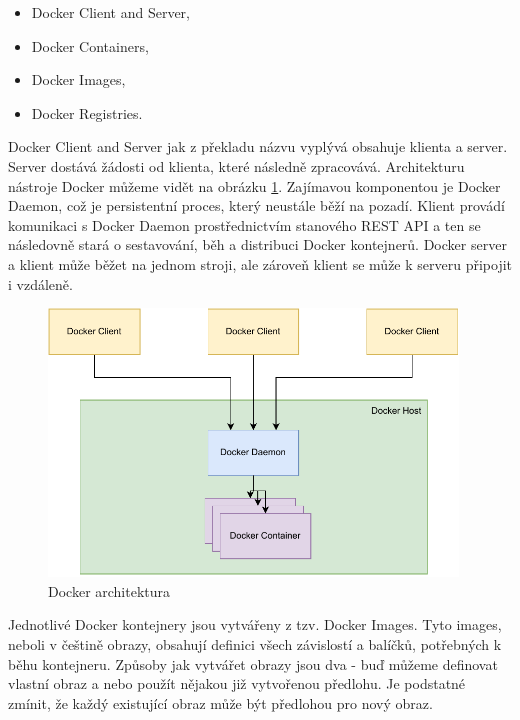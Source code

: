 \begin{itemize}
    \item Docker Client and Server,
    \item Docker Containers,
    \item Docker Images,
    \item Docker Registries.
\end{itemize}

Docker Client and Server jak z překladu názvu vyplývá obsahuje klienta a server. Server dostává žádosti od klienta, které následně zpracovává. Architekturu nástroje Docker můžeme vidět na obrázku \ref{fig:docker_arch}. Zajímavou komponentou je Docker Daemon, což je persistentní proces, který neustále běží na pozadí. Klient provádí komunikaci s Docker Daemon prostřednictvím stanového REST API a ten se následovně stará o sestavování, běh a distribuci Docker kontejnerů. Docker server a klient může běžet na jednom stroji, ale zároveň klient se může k serveru připojit i vzdáleně. 
\cite{turnbull2014docker}\cite{docker_overview}

\begin{figure}[htbp]
    \centering 
    \includegraphics[width=0.97\textwidth]{assets/img/docker_arch.pdf}
    \caption{Docker architektura}
    \label{fig:docker_arch}
\end{figure}

Jednotlivé Docker kontejnery jsou vytvářeny z tzv. Docker Images. Tyto images, neboli v češtině obrazy, obsahují definici všech závislostí a balíčků, potřebných k běhu kontejneru. Způsoby jak vytvářet obrazy jsou dva - buď můžeme definovat vlastní obraz a nebo použít nějakou již vytvořenou předlohu. Je podstatné zmínit, že každý existující obraz může být předlohou pro nový obraz. 

